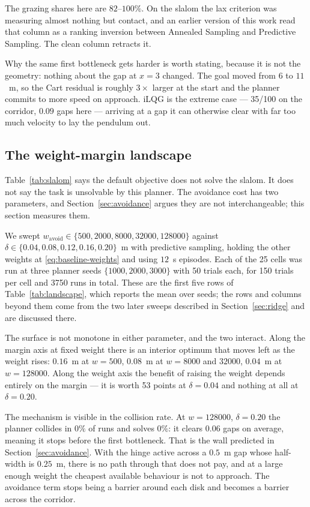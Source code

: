 \documentclass[conference]{IEEEtran}
\begin{document}
The grazing shares here are $82$--$100\%$. On the slalom the lax criterion was
measuring almost nothing but contact, and an earlier version of this work read
that column as a ranking inversion between Annealed Sampling and Predictive
Sampling. The clean column retracts it.

Why the same first bottleneck gets harder is worth stating, because it is not the
geometry: nothing about the gap at $x=3$ changed. The goal moved from $6$ to
$11$~m, so the Cart residual is roughly $3\times$ larger at the start and the
planner commits to more speed on approach. iLQG is the extreme case --- 35/100 on
the corridor, $0.09$ gaps here --- arriving at a gap it can otherwise clear with
far too much velocity to lay the pendulum out.

\subsection{The weight-margin landscape}
\label{sec:landscape}

Table~\ref{tab:slalom} says the default objective does not solve the slalom. It
does not say the task is unsolvable by this planner. The avoidance cost has two
parameters, and Section~\ref{sec:avoidance} argues they are not
interchangeable; this section measures them.

We swept $w_{\text{avoid}} \in \{500, 2000, 8000, 32000, 128000\}$ against
$\delta \in \{0.04, 0.08, 0.12, 0.16, 0.20\}$~m with predictive sampling, holding
the other weights at \eqref{eq:baseline-weights} and using $12$~s episodes. Each
of the 25 cells was run at three planner seeds $\{1000, 2000, 3000\}$ with 50
trials each, for 150 trials per cell and 3750 runs in total. These are the first
five rows of Table~\ref{tab:landscape}, which reports the mean over seeds; the
rows and columns beyond them come from the two later sweeps described in
Section~\ref{sec:ridge} and are discussed there.



The surface is not monotone in either parameter, and the two interact. Along the
margin axis at fixed weight there is an interior optimum that moves left as the
weight rises: $0.16$~m at $w = 500$, $0.08$~m at $w = 8000$ and $32000$,
$0.04$~m at $w = 128000$. Along the weight axis the benefit of raising the weight
depends entirely on the margin --- it is worth 53 points at $\delta = 0.04$ and
nothing at all at $\delta = 0.20$.

The mechanism is visible in the collision rate. At $w = 128000$, $\delta = 0.20$
the planner collides in $0\%$ of runs and solves $0\%$: it clears $0.06$ gaps on
average, meaning it stops before the first bottleneck. That is the wall predicted
in Section~\ref{sec:avoidance}. With the hinge active across a $0.5$~m gap whose
half-width is $0.25$~m, there is no path through that does not pay, and at a
large enough weight the cheapest available behaviour is not to approach. The
avoidance term stops being a barrier around each disk and becomes a barrier
across the corridor.
\end{document}
